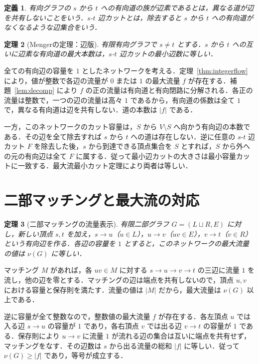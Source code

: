 \documentclass[a5paper,10pt,onecolumn]{jsarticle}
\makeatletter
\theoremstyle{mathnotetheorem}
\newtheorem{theorem}{定理}[section]
\newtheorem{definition}[theorem]{定義}
\renewcommand{\proofname}{証明}
\renewenvironment{proof}[1][\proofname]{%
  \par\pushQED{\qed}\normalfont\topsep4\p@\@plus2\p@\relax
  \trivlist\item[\hskip\labelsep\bfseries #1]\ignorespaces
}{\popQED\endtrivlist\@endpefalse}
\makeatother
\begin{document}
\begin{definition}
有向グラフの $s$ から $t$ への有向道の族が\emph{辺素}であるとは，異なる道が辺を共有しないことをいう．$s$-$t$ 辺カットとは，除去すると $s$ から $t$ への有向道がなくなるような辺集合をいう．
\end{definition}
\begin{theorem}[Mengerの定理：辺版]\label{thm:menger}
有限有向グラフで $s\ne t$ とする．$s$ から $t$ への互いに辺素な有向道の最大本数は，$s$-$t$ 辺カットの最小辺数に等しい．
\end{theorem}
\begin{proof}
全ての有向辺の容量を $1$ としたネットワークを考える．定理~\ref{thm:integerflow} により，値が整数で各辺の流量が $0$ または $1$ の最大流量 $f$ が存在する．補題~\ref{lem:decomp} により $f$ の正の流量は有向道と有向閉路に分解される．各正の流量は整数で，一つの辺の流量は高々 $1$ であるから，有向道の係数は全て $1$ で，異なる有向道は辺を共有しない．道の本数は $|f|$ である．

一方，このネットワークのカット容量は，$S$ から $V\setminus S$ へ向かう有向辺の本数である．その辺を全て除去すれば $s$ から $t$ への道は存在しない．逆に任意の $s$-$t$ 辺カット $F$ を除去した後，$s$ から到達できる頂点集合を $S$ とすれば，$S$ から外への元の有向辺は全て $F$ に属する．従って最小辺カットの大きさは最小容量カットに一致する．最大流最小カット定理により両者は等しい．
\end{proof}

\section{二部マッチングと最大流の対応}
\begin{theorem}[二部マッチングの流量表示]\label{thm:matching-flow}
有限二部グラフ $G=(L\sqcup R,E)$ に対し，新しい頂点 $s,t$ を加え，$s\to u$（$u\in L$），$u\to v$（$uv\in E$），$v\to t$（$v\in R$）という有向辺を作る．各辺の容量を $1$ とすると，このネットワークの最大流量の値は $\nu(G)$ に等しい．
\end{theorem}
\begin{proof}
マッチング $M$ があれば，各 $uv\in M$ に対する $s\to u\to v\to t$ の三辺に流量 $1$ を流し，他の辺を零とする．マッチングの辺は端点を共有しないので，頂点 $u,v$ における容量と保存則を満たす．流量の値は $|M|$ だから，最大流量は $\nu(G)$ 以上である．

逆に容量が全て整数なので，整数値の最大流量 $f$ が存在する．各左頂点 $u$ では入る辺 $s\to u$ の容量が $1$ であり，各右頂点 $v$ では出る辺 $v\to t$ の容量が $1$ である．保存則により $u\to v$ に流量 $1$ が流れる辺の集合は互いに端点を共有せず，マッチングをなす．その辺数は $s$ から出る流量の総和 $|f|$ に等しい．従って $\nu(G)\ge|f|$ であり，等号が成立する．
\end{proof}
\end{document}
